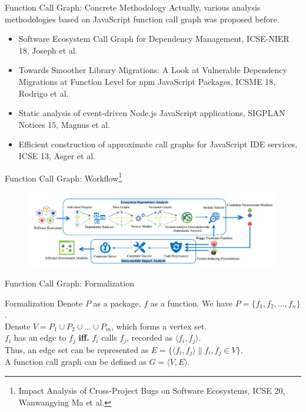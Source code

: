 \documentclass{beamer}
\begin{document}
\begin{frame}{Function Call Graph: Concrete Methodology}
Actually, various analysis methodologies based on JavaScript function call graph was proposed before.
\begin{itemize}
    \item Software Ecosystem Call Graph for Dependency Management, ICSE-NIER 18, Joseph et al.
    \item Towards Smoother Library Migrations: A Look at Vulnerable Dependency Migrations at Function Level for npm JavaScript Packages, ICSME 18, Rodrigo et al.
    \item Static analysis of event-driven Node.js JavaScript applications, SIGPLAN Notices 15, Magnus et al.
    \item Efficient construction of approximate call graphs for JavaScript IDE services, ICSE 13, Asger et al.
\end{itemize}
\end{frame}

\begin{frame}{Function Call Graph: Workflow\footnote{Impact Analysis of Cross-Project Bugs on Software Ecosystems, ICSE 20, Wanwangying Ma et al.}}
\begin{figure}
    \centering
    \includegraphics[width=\textwidth]{workflow.jpg}
\end{figure}
\end{frame}

\begin{frame}{Function Call Graph: Formalization}
\begin{block}{Formalization}
Denote $P$ as a package, $f$ as a function. We have $P = \{f_1,f_2,\dots,f_n\}$. \\
Denote $V = P_1\cup P_2\cup \dots \cup P_m$, which forms a vertex set.\\ $f_i$ has an edge to $f_j$ \textbf{iff.} $f_i$ calls $f_j$, recorded as $\langle f_i, f_j \rangle$.\\
Thus, an edge set can be represented as $E = \{ \langle f_i, f_j \rangle \| f_i, f_j \in V \}$.\\
A function call graph can be defined as $G = \langle V, E \rangle$.
\end{block}
\end{frame}
\end{document}
